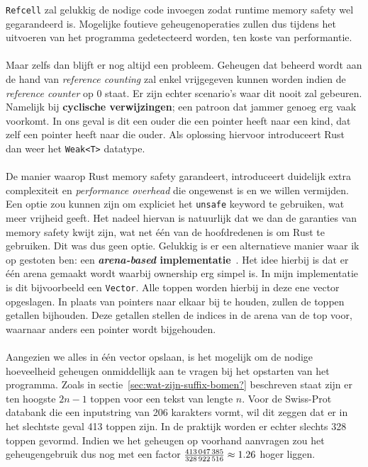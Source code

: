 \texttt{Refcell} zal gelukkig de nodige code invoegen zodat runtime memory safety wel gegarandeerd is.
Mogelijke foutieve geheugenoperaties zullen dus tijdens het uitvoeren van het programma gedetecteerd worden, ten koste van performantie.
\\ \\
Maar zelfs dan blijft er nog altijd een probleem.
Geheugen dat beheerd wordt aan de hand van \textit{reference counting} zal enkel vrijgegeven kunnen worden indien de \textit{reference counter} op 0 staat.
Er zijn echter scenario's waar dit nooit zal gebeuren.
Namelijk bij \textbf{cyclische verwijzingen}; een patroon dat jammer genoeg erg vaak voorkomt.
In ons geval is dit een ouder die een pointer heeft naar een kind, dat zelf een pointer heeft naar die ouder.
Als oplossing hiervoor introduceert Rust dan weer het \texttt{Weak<T>} datatype.
\\ \\
De manier waarop Rust memory safety garandeert, introduceert duidelijk extra complexiteit en \textit{performance overhead} die ongewenst is en we willen vermijden.
Een optie zou kunnen zijn om expliciet het \texttt{unsafe} keyword te gebruiken, wat meer vrijheid geeft.
Het nadeel hiervan is natuurlijk dat we dan de garanties van memory safety kwijt zijn, wat net één van de hoofdredenen is om Rust te gebruiken.
Dit was dus geen optie.
Gelukkig is er een alternatieve manier waar ik op gestoten ben: een \textbf{\textit{arena-based} implementatie}~\cite{rust_arena_trees}.
Het idee hierbij is dat er één arena gemaakt wordt waarbij ownership erg simpel is.
In mijn implementatie is dit bijvoorbeeld een \texttt{Vector}.
Alle toppen worden hierbij in deze ene vector opgeslagen.
In plaats van pointers naar elkaar bij te houden, zullen de toppen getallen bijhouden.
Deze getallen stellen de indices in de arena van de top voor, waarnaar anders een pointer wordt bijgehouden.
\\ \\
Aangezien we alles in één vector opslaan, is het mogelijk om de nodige hoeveelheid geheugen onmiddellijk aan te vragen bij het opstarten van het programma.
Zoals in sectie~\ref{sec:wat-zijn-suffix-bomen?} beschreven staat zijn er ten hoogste $2n - 1$ toppen voor een tekst van lengte $n$.
Voor de Swiss-Prot databank die een inputstring van 206 karakters vormt, wil dit zeggen dat er in het slechtste geval 413 toppen zijn.
In de praktijk worden er echter slechts 328 toppen gevormd.
Indien we het geheugen op voorhand aanvragen zou het geheugengebruik dus nog met een factor $\frac{413\thinspace047\thinspace385}{328\thinspace922\thinspace516} \approx 1.26$ hoger liggen.
